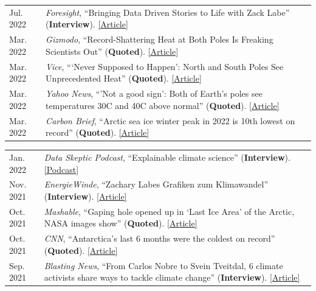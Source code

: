 \documentclass[margin,line,palatino,courier,10pt]{res}
\begin{document}
\begin{resume}
\begin{tabular}{@{}p{0.9in}p{4in}}
Jul. 2022 & \textit{Foresight}, ``Bringing Data Driven Stories to Life with Zack Labe'' (\textbf{Interview}). \href{https://www.climateforesight.eu/interview/bringing-data-driven-stories-to-life-with-zack-labe/}{[Article]}\\
Mar. 2022 & \textit{Gizmodo}, ``Record-Shattering Heat at Both Poles Is Freaking Scientists Out'' (\textbf{Quoted}). \href{https://gizmodo.com/record-shattering-heat-at-both-poles-is-freaking-scient-1848687193}{[Article]}\\
Mar. 2022 & \textit{Vice}, ```Never Supposed to Happen': North and South Poles See Unprecedented Heat'' (\textbf{Quoted}). \href{https://www.vice.com/en/article/5dg4va/never-supposed-to-happen-north-and-south-poles-see-unprecedented-heat}{[Article]}\\
Mar. 2022 & \textit{Yahoo News}, ``'Not a good sign': Both of Earth’s poles see temperatures 30C and 40C above normal'' (\textbf{Quoted}). \href{https://news.yahoo.com/not-a-good-sign-both-of-earths-poles-see-temperatures-30-c-and-40-c-above-normal-155815110.html}{[Article]}\\
Mar. 2022 & \textit{Carbon Brief}, ``Arctic sea ice winter peak in 2022 is 10th lowest on record'' (\textbf{Quoted}). \href{https://www.carbonbrief.org/arctic-sea-ice-winter-peak-in-2022-is-10th-lowest-on-record}{[Article]}\\
\end{tabular}
\begin{tabular}{@{}p{0.9in}p{4in}}
Jan. 2022 & \textit{Data Skeptic Podcast}, ``Explainable climate science'' (\textbf{Interview}). \href{https://dataskeptic.com/blog/episodes/2022/explainable-climate-science}{[Podcast]}\\
Nov. 2021 & \textit{EnergieWinde}, ``Zachary Labes Grafiken zum Klimawandel'' (\textbf{Interview}). \href{https://energiewinde.orsted.de/klimawandel-umwelt/zachary-labe-grafiken-arktis-klimawandel-interview-wissenschaftskommunikation}{[Article]}\\
Oct. 2021 & \textit{Mashable}, ``Gaping hole opened up in `Last Ice Area' of the Arctic, NASA images show'' (\textbf{Quoted}). \href{https://mashable.com/article/arctic-climate-change}{[Article]}\\
Oct. 2021 & \textit{CNN}, ``Antarctica's last 6 months were the coldest on record'' (\textbf{Quoted}). \href{https://www.cnn.com/2021/10/09/weather/weather-record-cold-antarctica-climate-change/index.html}{[Article]}\\
Sep. 2021 & \textit{Blasting News}, ``From Carlos Nobre to Svein Tveitdal, 6 climate activists share ways to tackle climate change'' (\textbf{Interview}). \href{https://us.blastingnews.com/world/2021/01/from-carlos-nobre-to-svein-tveitdal-4-climate-activists-share-ways-to-tackle-climate-change-003258138.html}{[Article]}\\

\end{tabular}
\end{resume}
\end{document}
